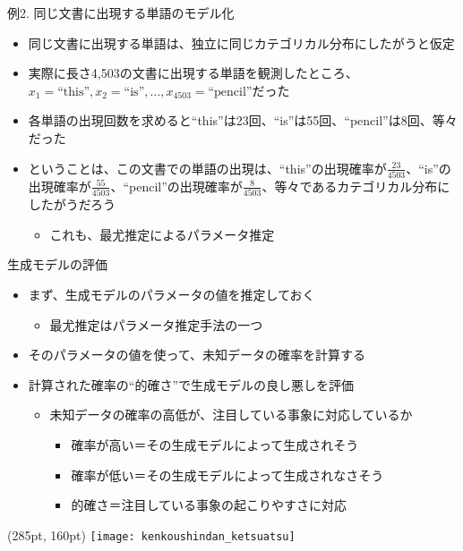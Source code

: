 \documentclass[aspectratio=169,unicode,dvipdfmx,14pt]{beamer}
\begin{document}
\begin{frame}{例2. 同じ文書に出現する単語のモデル化}
\begin{itemize}
\item 同じ文書に出現する単語は、独立に同じカテゴリカル分布にしたがうと仮定
\item 実際に長さ4,503の文書に出現する単語を観測したところ、$x_1=\mbox{``this''}, x_2=\mbox{``is''}, \ldots, x_{4503}=\mbox{``pencil''}$だった
\item 各単語の出現回数を求めると``this''は23回、``is''は55回、``pencil''は8回、等々だった
\item ということは、この文書での単語の出現は、``this''の出現確率が$\frac{23}{4503}$、``is''の出現確率が$\frac{55}{4503}$、``pencil''の出現確率が$\frac{8}{4503}$、等々であるカテゴリカル分布にしたがうだろう
\begin{itemize}
\item これも、最尤推定によるパラメータ推定
\end{itemize}
\end{itemize}
\end{frame}


\begin{frame}{生成モデルの評価}
\begin{itemize}
\item まず、生成モデルのパラメータの値を推定しておく
\begin{itemize}
\item 最尤推定はパラメータ推定手法の一つ
\end{itemize}
\item そのパラメータの値を使って、未知データの確率を計算する
\item 計算された確率の``的確さ''で生成モデルの良し悪しを評価
\begin{itemize}
\item 未知データの確率の高低が、注目している事象に対応しているか
\begin{itemize}
\item 確率が高い＝その生成モデルによって生成されそう
\item 確率が低い＝その生成モデルによって生成されなさそう
\item 的確さ＝注目している事象の起こりやすさに対応
\end{itemize}
\end{itemize}
\end{itemize}
\begin{textblock*}{0.4\linewidth}(285pt, 160pt)
    \centering
    \texttt{[image: kenkoushindan\_ketsuatsu]}
\end{textblock*}

\end{frame}
\end{document}
